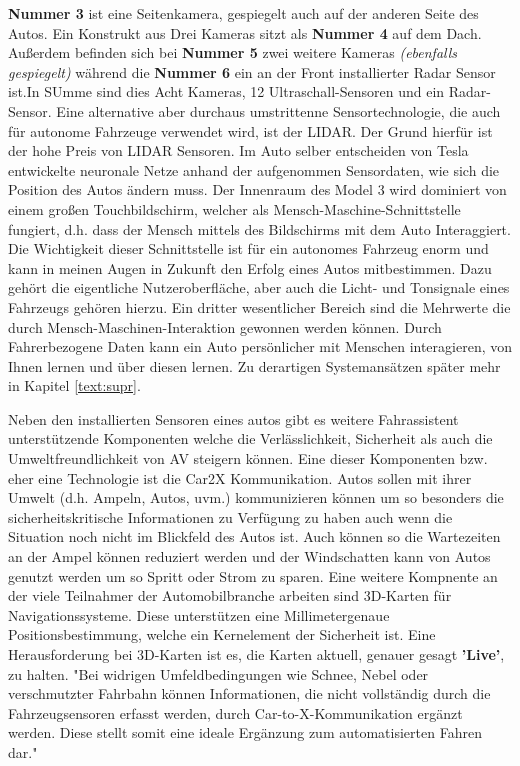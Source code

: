 \textbf{Nummer 3} ist eine Seitenkamera, gespiegelt auch auf der anderen Seite des Autos. Ein Konstrukt aus Drei Kameras sitzt als \textbf{Nummer 4} auf dem Dach. Außerdem befinden sich bei \textbf{Nummer 5} zwei weitere Kameras \textit{(ebenfalls gespiegelt)} während die \textbf{Nummer 6} ein an der Front installierter Radar Sensor ist.In SUmme sind dies Acht Kameras, 12 Ultraschall-Sensoren und ein Radar-Sensor. Eine alternative aber durchaus umstrittenne Sensortechnologie, die auch für autonome Fahrzeuge verwendet wird, ist der LIDAR\cite{b29}. Der Grund hierfür ist der hohe Preis von LIDAR Sensoren.
Im Auto selber entscheiden von Tesla entwickelte neuronale Netze anhand der aufgenommen Sensordaten, wie sich die Position des Autos ändern muss. Der Innenraum des Model 3 wird dominiert von einem großen Touchbildschirm, welcher als Mensch-Maschine-Schnittstelle fungiert, d.h. dass der Mensch mittels des Bildschirms mit dem Auto Interaggiert.\\
Die Wichtigkeit dieser Schnittstelle ist für ein autonomes Fahrzeug enorm und kann in meinen Augen in Zukunft den Erfolg eines Autos mitbestimmen. Dazu gehört die eigentliche Nutzeroberfläche, aber auch die Licht- und Tonsignale eines Fahrzeugs gehören hierzu. Ein dritter wesentlicher Bereich sind die Mehrwerte die durch Mensch-Maschinen-Interaktion gewonnen werden können. Durch Fahrerbezogene Daten kann ein Auto persönlicher mit Menschen interagieren, von Ihnen lernen und über diesen lernen. Zu derartigen Systemansätzen später mehr in Kapitel \ref{text:supr}.

Neben den installierten Sensoren eines autos gibt es weitere Fahrassistent unterstützende Komponenten welche die Verlässlichkeit, Sicherheit als auch die Umweltfreundlichkeit von AV steigern können.\cite{b30} Eine dieser Komponenten bzw. eher eine Technologie ist die Car2X Kommunikation. Autos sollen mit ihrer Umwelt (d.h. Ampeln, Autos, uvm.) kommunizieren können um so besonders die sicherheitskritische Informationen zu Verfügung zu haben auch wenn die Situation noch nicht im Blickfeld des Autos ist. Auch können so die Wartezeiten an der Ampel können reduziert werden und der Windschatten kann von Autos genutzt werden um so Spritt oder Strom zu sparen. Eine weitere Kompnente an der viele Teilnahmer der Automobilbranche arbeiten sind 3D-Karten für Navigationssysteme. Diese unterstützen eine Millimetergenaue Positionsbestimmung, welche ein Kernelement der Sicherheit ist. Eine Herausforderung bei 3D-Karten ist es, die Karten aktuell, genauer gesagt \textbf{'Live'}, zu halten. "Bei widrigen Umfeldbedingungen wie Schnee, Nebel oder verschmutzter Fahrbahn können Informationen, die nicht vollständig durch die Fahrzeugsensoren erfasst werden, durch Car-to-X-Kommunikation ergänzt werden. Diese stellt somit eine ideale Ergänzung zum automatisierten Fahren dar." \cite{25}


